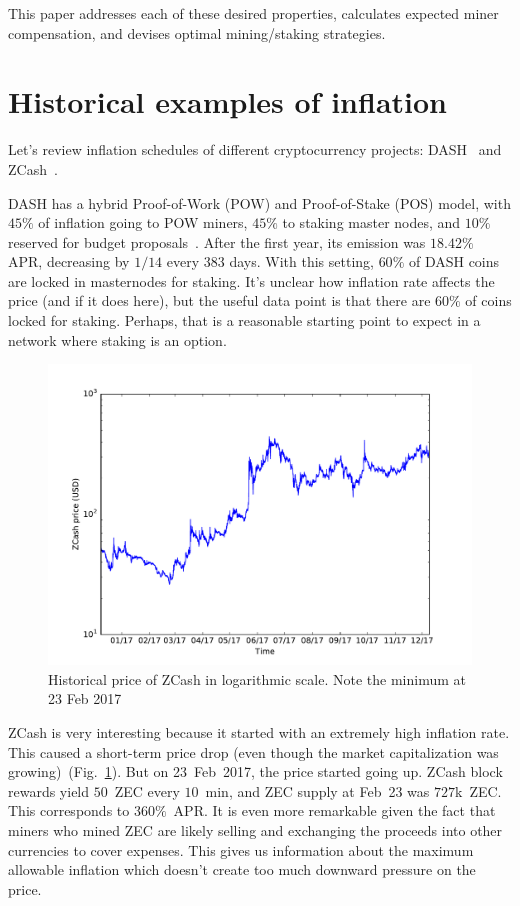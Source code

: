 \documentclass[longbibliography,nofootinbib,twocolumn]{revtex4-1}
\newcommand{\figref}[1]{Fig.~\ref{#1}}
\begin{document}
This paper addresses each of these desired properties, calculates expected miner compensation, and devises optimal mining/staking strategies.

\section{Historical examples of inflation}

Let's review inflation schedules of different cryptocurrency projects:
DASH~\cite{dash:whitepaper} and ZCash~\cite{zcash}.

DASH has a hybrid Proof-of-Work (POW) and Proof-of-Stake (POS) model,
with $45\%$ of inflation going to POW miners, $45\%$ to staking master nodes, and $10\%$ reserved for budget proposals~\cite{dash:emission}.
After the first year, its emission was $18.42\%$ APR, decreasing by $1/14$ every $383$ days.
With this setting, $60\%$ of DASH coins are locked in masternodes for staking.
It's unclear how inflation rate affects the price (and if it does here), but the useful data point is that there are $60\%$ of coins locked for staking.
Perhaps, that is a reasonable starting point to expect in a network where staking is an option.

\begin{figure}
    \includegraphics[width=\columnwidth]{pdf/zcash-price.pdf}
    \caption{Historical price of ZCash in logarithmic scale. Note the minimum at 23 Feb 2017}
    \label{fig:zec}
\end{figure}

ZCash is very interesting because it started with an extremely high inflation rate.
This caused a short-term price drop (even though the market capitalization was growing)~(\figref{fig:zec}).
But on 23~Feb~2017, the price started going up.
ZCash block rewards yield $50$~ZEC every $10$~min, and ZEC supply at Feb~23 was $727$k~ZEC.
This corresponds to $360\%$~APR.
It is even more remarkable given the fact that miners who mined ZEC are likely selling and exchanging the proceeds into other currencies to cover expenses.
This gives us information about the maximum allowable inflation which doesn't create too much downward pressure on the price.
\end{document}

